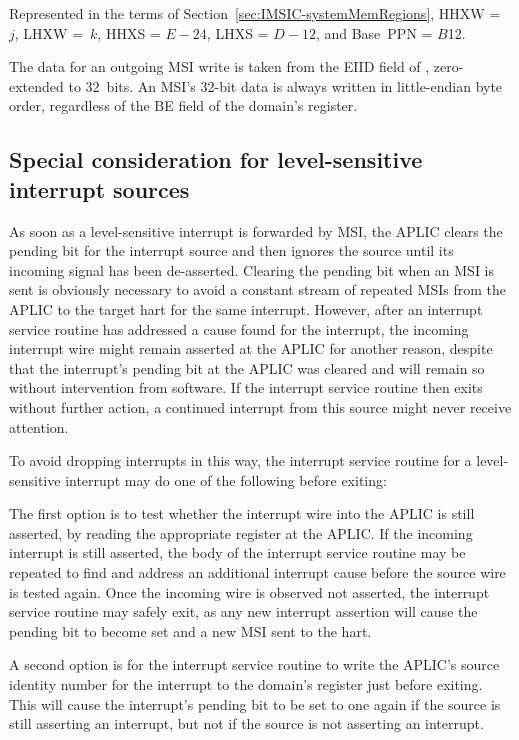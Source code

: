 Represented in the terms of Section~\ref{sec:IMSIC-systemMemRegions},
HHXW =~$j$, LHXW =~$k$, HHXS = ${E-24}$, LHXS = ${D-12}$, and
Base~PPN = $B$\z{>>}12.

The data for an outgoing MSI write is taken from the EIID field of
, zero-extended to 32~bits.
An MSI's \mbox{32-bit} data is always written in little-endian byte
order, regardless of the BE field of the domain's 
register.

\subsection{Special consideration for level-sensitive interrupt sources}

As soon as a level-sensitive interrupt is forwarded by MSI, the APLIC
clears the pending bit for the interrupt source and then ignores the
source until its incoming signal has been de-asserted.
Clearing the pending bit when an MSI is sent is obviously necessary to
avoid a constant stream of repeated MSIs from the APLIC to the target
hart for the same interrupt.
However, after an interrupt service routine has addressed a cause found
for the interrupt, the incoming interrupt wire might remain asserted at
the APLIC for another reason, despite that the interrupt's pending bit
at the APLIC was cleared and will remain so without intervention from
software.
If the interrupt service routine then exits without further action,
a continued interrupt from this source might never receive attention.

To avoid dropping interrupts in this way, the interrupt service routine
for a level-sensitive interrupt may do one of the following before
exiting:

The first option is to test whether the interrupt wire into the APLIC
is still asserted, by reading the appropriate  register at
the APLIC.
If the incoming interrupt is still asserted, the body of the interrupt
service routine may be repeated to find and address an additional
interrupt cause before the source wire is tested again.
Once the incoming wire is observed not asserted, the interrupt service
routine may safely exit, as any new interrupt assertion will cause the
pending bit to become set and a new MSI sent to the hart.

A second option is for the interrupt service routine to write the
APLIC's source identity number for the interrupt to the domain's
 register just before exiting.
This will cause the interrupt's pending bit to be set to one again if
the source is still asserting an interrupt, but not if the source is
not asserting an interrupt.


